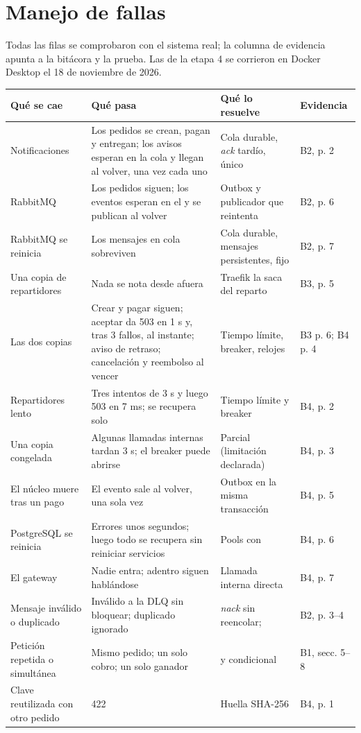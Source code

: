 \documentclass[11pt]{article}
\begin{document}
\section{Manejo de fallas}\label{sec:fallas}

Todas las filas se comprobaron con el sistema real; la columna de evidencia apunta a la bitácora y la
prueba. Las de la etapa 4 se corrieron en Docker Desktop el 18 de noviembre de 2026.

{\small\begin{longtable}{@{}P{3.0cm} P{6.0cm} P{3.9cm} P{1.9cm}@{}}
\toprule
\textsf{\textbf{Qué se cae}} & \textsf{\textbf{Qué pasa}} & \textsf{\textbf{Qué lo resuelve}} & \textsf{\textbf{Evidencia}} \\
\midrule
\endhead
Notificaciones & Los pedidos se crean, pagan y entregan; los avisos esperan en la cola y llegan al volver, una vez cada uno & Cola durable, \emph{ack} tardío,  único & B2, p. 2 \\
RabbitMQ & Los pedidos siguen; los eventos esperan en el  y se publican al volver & Outbox y publicador que reintenta & B2, p. 6 \\
RabbitMQ se reinicia & Los mensajes en cola sobreviven & Cola durable, mensajes persistentes,  fijo & B2, p. 7 \\
Una copia de repartidores & Nada se nota desde afuera & Traefik la saca del reparto & B3, p. 5 \\
Las dos copias & Crear y pagar siguen; aceptar da 503 en 1 s y, tras 3 fallos, al instante; aviso de retraso; cancelación y reembolso al vencer & Tiempo límite, breaker, relojes & B3 p. 6; B4 p. 4 \\
Repartidores lento & Tres intentos de 3 s y luego 503 en 7 ms; se recupera solo & Tiempo límite y breaker & B4, p. 2 \\
Una copia congelada & Algunas llamadas internas tardan 3 s; el breaker puede abrirse & Parcial (limitación declarada) & B4, p. 3 \\
El núcleo muere tras un pago & El evento sale al volver, una sola vez & Outbox en la misma transacción & B4, p. 5 \\
PostgreSQL se reinicia & Errores unos segundos; luego todo se recupera sin reiniciar servicios & Pools con  & B4, p. 6 \\
El gateway & Nadie entra; adentro siguen hablándose & Llamada interna directa & B4, p. 7 \\
Mensaje inválido o duplicado & Inválido a la DLQ sin bloquear; duplicado ignorado & \emph{nack} sin reencolar;  & B2, p. 3--4 \\
Petición repetida o simultánea & Mismo pedido; un solo cobro; un solo ganador &  y  condicional & B1, secc. 5--8 \\
Clave reutilizada con otro pedido & 422 & Huella SHA-256 & B4, p. 1 \\
\bottomrule
\end{longtable}}
\end{document}
